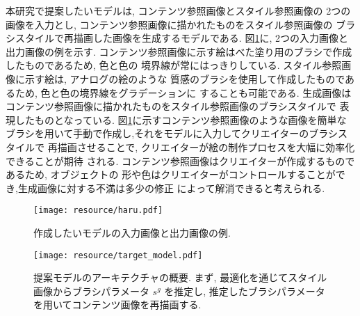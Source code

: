 \documentclass[MIRU,submit,uplatex]{miru2023j}
\begin{document}
本研究で提案したいモデルは, コンテンツ参照画像とスタイル参照画像の
2つの画像を入力とし, コンテンツ参照画像に描かれたものをスタイル参照画像の
ブラシスタイルで再描画した画像を生成するモデルである. 
図\ref{fig:haru}に, 2つの入力画像と出力画像の例を示す.
コンテンツ参照画像に示す絵はべた塗り用のブラシで作成したものであるため, 色と色の
境界線が常にはっきりしている. スタイル参照画像に示す絵は, アナログの絵のような
質感のブラシを使用して作成したものであるため, 色と色の境界線をグラデーションに
することも可能である.
生成画像はコンテンツ参照画像に描かれたものをスタイル参照画像のブラシスタイルで
表現したものとなっている. 図\ref{fig:haru}に示すコンテンツ参照画像のような画像を簡単な
ブラシを用いて手動で作成し,それをモデルに入力してクリエイターのブラシスタイルで
再描画させることで, クリエイターが絵の制作プロセスを大幅に効率化できることが期待
される. コンテンツ参照画像はクリエイターが作成するものであるため, オブジェクトの
形や色はクリエイターがコントロールすることができ,生成画像に対する不満は多少の修正
によって解消できると考えられる.
\begin{figure}
    \centering
    \texttt{[image: resource/haru.pdf]}
    \caption{作成したいモデルの入力画像と出力画像の例.}
    \label{fig:haru}
\end{figure}

\begin{figure*}[t]
    \centering
    \texttt{[image: resource/target\_model.pdf]}
    \caption{提案モデルのアーキテクチャの概要. 
    まず, 最適化を通じてスタイル画像からブラシパラメータ $s^g$ を推定し, 
    推定したブラシパラメータを用いてコンテンツ画像を再描画する. 
    }
    \label{fig:final_model}
\end{figure*}
\end{document}
